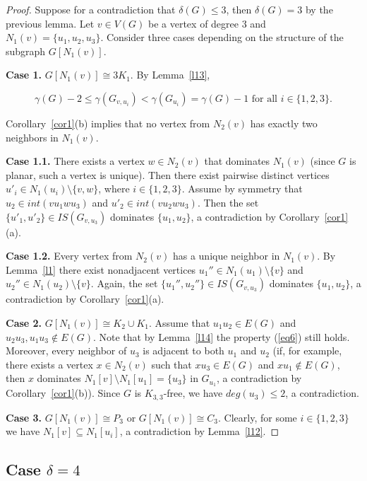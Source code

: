 \documentclass[12pt]{article}
\begin{document}
\begin{proof}
Suppose for a contradiction that $\delta(G) \leq 3$, then $\delta(G) = 3$ by the previous lemma. Let $v \in V(G)$ be a vertex of degree 3 and $N_1(v) = \{u_1,u_2,u_3\}$. Consider three cases depending on the structure of the subgraph $G[N_1(v)]$.

\textbf{Case 1.} $G[N_1(v)] \cong 3K_1$. By Lemma~\ref{l13},

\begin{equation}\label{eq6}
\gamma(G) - 2 \leq \gamma(G_{v,u_i}) < \gamma(G_{u_i}) = \gamma(G) - 1 \text{ for all } i \in \{1,2,3\}.
\end{equation}

Corollary~\ref{cor1}(b) implies that no vertex from $N_2(v)$ has exactly two neighbors in $N_1(v)$. 

\textbf{Case 1.1.} There exists a vertex $w \in N_2(v)$ that dominates $N_1(v)$ (since $G$ is planar, such a vertex is unique). Then there exist pairwise distinct vertices $u'_i \in N_1(u_i) \setminus \{v,w\}$, where $i \in \{1,2,3\}$. Assume by symmetry that $u_2 \in int(vu_1wu_3)$ and $u'_2 \in int(vu_2wu_3)$. Then the set $\{u'_1,u'_2\} \in IS(G_{v,u_3})$ dominates $\{u_1,u_2\}$, a contradiction by Corollary~\ref{cor1}(a). 

\textbf{Case 1.2.} Every vertex from $N_2(v)$ has a unique neighbor in $N_1(v)$. By Lemma~\ref{l1} there exist nonadjacent vertices $u_1'' \in N_1(u_1) \setminus \{v\}$ and $u_2'' \in N_1(u_2) \setminus \{v\}$. Again, the set $\{u_1'',u_2''\} \in IS(G_{v,u_3})$ dominates $\{u_1,u_2\}$, a contradiction by Corollary~\ref{cor1}(a).

\textbf{Case 2.} $G[N_1(v)] \cong K_2 \cup K_1$. Assume that $u_1u_2 \in E(G)$ and $u_2u_3,u_1u_3 \notin E(G)$. Note that by Lemma~\ref{l14} the property (\ref{eq6}) still holds. Moreover, every neighbor of $u_3$ is adjacent to both $u_1$ and $u_2$ (if, for example, there exists a vertex $x \in N_2(v)$ such that $xu_3 \in E(G)$ and $xu_1 \notin E(G)$, then $x$ dominates $N_1[v] \setminus N_1[u_1] = \{u_3\}$ in $G_{u_1}$, a contradiction by Corollary~\ref{cor1}(b)). Since $G$ is $K_{3,3}$-free, we have $deg(u_3) \leq 2$, a contradiction.

\textbf{Case 3.} $G[N_1(v)] \cong P_3$ or $G[N_1(v)] \cong C_3$. Clearly, for some $i \in \{1,2,3\}$ we have $N_1[v] \subseteq N_1[u_i]$, a contradiction by Lemma~\ref{l12}.
\end{proof}

\subsection{Case $\delta = 4$}
\end{document}
